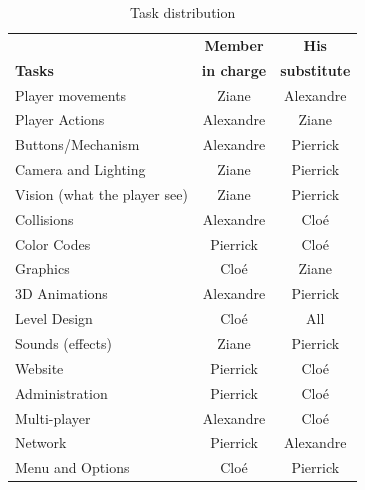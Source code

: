 \documentclass[12pt]{article}
\begin{document}
\begin{table}[h!]
	\begin{center}
		\label{tab:table1}
		\begin{tabular}{|l||c|c|}
        	\hline
			& \textbf{Member} & \textbf{His}\\
			\textbf{Tasks} & \textbf{in charge} & \textbf{substitute} \\
			\hline \hline
			Player movements & \cellcolor{blue!25}Ziane & \cellcolor{red!25}Alexandre \\\hline
            Player Actions & \cellcolor{red!25}Alexandre & \cellcolor{blue!25}Ziane\\\hline
            Buttons/Mechanism & \cellcolor{red!25}Alexandre & \cellcolor{yellow!25}Pierrick\\\hline
			Camera and Lighting & \cellcolor{blue!25}Ziane & \cellcolor{yellow!25}Pierrick \\\hline
            Vision (what the player see)  & \cellcolor{blue!25}Ziane & \cellcolor{yellow!25}Pierrick\\\hline
            Collisions & \cellcolor{red!25}Alexandre & \cellcolor{green!25}Cloé\\\hline
            Color Codes & \cellcolor{yellow!25}Pierrick & \cellcolor{green!25}Cloé\\\hline
            Graphics & \cellcolor{green!25}Cloé & \cellcolor{blue!25}Ziane\\\hline
            3D Animations & \cellcolor{red!25}Alexandre & \cellcolor{yellow!25}Pierrick\\\hline
            Level Design & \cellcolor{green!25}Cloé & \cellcolor{pink!25}All\\\hline
            Sounds (effects) & \cellcolor{blue!25}Ziane & \cellcolor{yellow!25}Pierrick\\\hline
            Website & \cellcolor{yellow!25}Pierrick & \cellcolor{green!25}Cloé\\\hline
            Administration & \cellcolor{yellow!25}Pierrick & \cellcolor{green!25}Cloé \\\hline
      		Multi-player & \cellcolor{red!25}Alexandre & \cellcolor{green!25}Cloé\\\hline
            Network & \cellcolor{yellow!25}Pierrick & \cellcolor{red!25}Alexandre\\\hline
            Menu and Options & \cellcolor{green!25}Cloé & \cellcolor{yellow!25}Pierrick \\\hline
		\end{tabular}
		\caption{Task distribution}
	\end{center}
\end{table}
\end{document}
